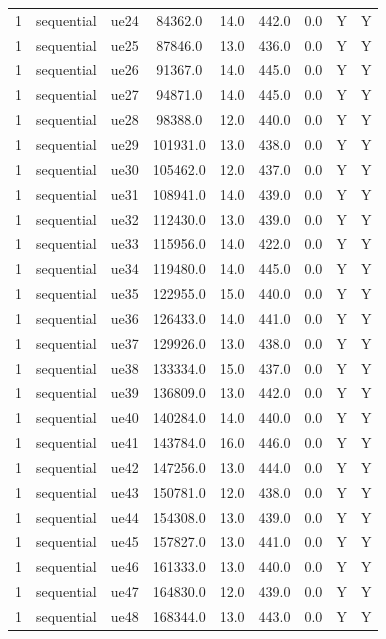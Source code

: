 \begin{table}[ht]
\begin{tabular}{|c|c|c|c|c|c|c|c|c|}
1 & sequential & ue24 & 84362.0 & 14.0 & 442.0 & 0.0 & Y & Y \\
1 & sequential & ue25 & 87846.0 & 13.0 & 436.0 & 0.0 & Y & Y \\
1 & sequential & ue26 & 91367.0 & 14.0 & 445.0 & 0.0 & Y & Y \\
1 & sequential & ue27 & 94871.0 & 14.0 & 445.0 & 0.0 & Y & Y \\
1 & sequential & ue28 & 98388.0 & 12.0 & 440.0 & 0.0 & Y & Y \\
1 & sequential & ue29 & 101931.0 & 13.0 & 438.0 & 0.0 & Y & Y \\
1 & sequential & ue30 & 105462.0 & 12.0 & 437.0 & 0.0 & Y & Y \\
1 & sequential & ue31 & 108941.0 & 14.0 & 439.0 & 0.0 & Y & Y \\
1 & sequential & ue32 & 112430.0 & 13.0 & 439.0 & 0.0 & Y & Y \\
1 & sequential & ue33 & 115956.0 & 14.0 & 422.0 & 0.0 & Y & Y \\
1 & sequential & ue34 & 119480.0 & 14.0 & 445.0 & 0.0 & Y & Y \\
1 & sequential & ue35 & 122955.0 & 15.0 & 440.0 & 0.0 & Y & Y \\
1 & sequential & ue36 & 126433.0 & 14.0 & 441.0 & 0.0 & Y & Y \\
1 & sequential & ue37 & 129926.0 & 13.0 & 438.0 & 0.0 & Y & Y \\
1 & sequential & ue38 & 133334.0 & 15.0 & 437.0 & 0.0 & Y & Y \\
1 & sequential & ue39 & 136809.0 & 13.0 & 442.0 & 0.0 & Y & Y \\
1 & sequential & ue40 & 140284.0 & 14.0 & 440.0 & 0.0 & Y & Y \\
1 & sequential & ue41 & 143784.0 & 16.0 & 446.0 & 0.0 & Y & Y \\
1 & sequential & ue42 & 147256.0 & 13.0 & 444.0 & 0.0 & Y & Y \\
1 & sequential & ue43 & 150781.0 & 12.0 & 438.0 & 0.0 & Y & Y \\
1 & sequential & ue44 & 154308.0 & 13.0 & 439.0 & 0.0 & Y & Y \\
1 & sequential & ue45 & 157827.0 & 13.0 & 441.0 & 0.0 & Y & Y \\
1 & sequential & ue46 & 161333.0 & 13.0 & 440.0 & 0.0 & Y & Y \\
1 & sequential & ue47 & 164830.0 & 12.0 & 439.0 & 0.0 & Y & Y \\
1 & sequential & ue48 & 168344.0 & 13.0 & 443.0 & 0.0 & Y & Y \\

\end{tabular}
\end{table}
